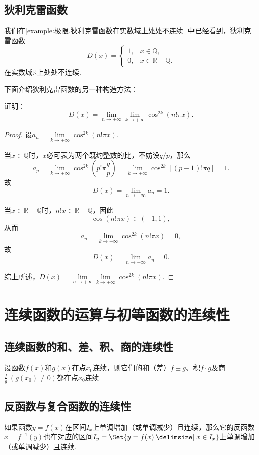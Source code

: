 \subsection{狄利克雷函数}
我们在\cref{example:极限.狄利克雷函数在实数域上处处不连续} 中已经看到，狄利克雷函数\[
D(x) = \left\{ \begin{array}{ll}
1, & x \in \mathbb{Q}, \\
0, & x \in \mathbb{R} - \mathbb{Q}.
\end{array} \right.
\]在实数域\(\mathbb{R}\)上处处不连续.

下面介绍狄利克雷函数的另一种构造方法：
\begin{example}
证明：\[
D(x) = \lim\limits_{n\to+\infty} \lim\limits_{k\to+\infty} \cos^{2k}(n! \pi x).
\]
\begin{proof}
设\(a_n = \lim\limits_{k\to+\infty} \cos^{2k}(n! \pi x)\).

当\(x \in \mathbb{Q}\)时，\(x\)必可表为两个既约整数的比，不妨设\(q/p\)，那么\[
a_p = \lim\limits_{k\to+\infty} \cos^{2k}\left(p! \pi \frac{q}{p}\right)
= \lim\limits_{k\to+\infty} \cos^{2k}[(p-1)! \pi q] = 1.
\]故\[
D(x) = \lim\limits_{n\to+\infty} a_n = 1.
\]

当\(x \in \mathbb{R}-\mathbb{Q}\)时，\(n! x \in \mathbb{R}-\mathbb{Q}\)，因此\[
\cos(n! \pi x) \in (-1,1),
\]从而\[
a_n = \lim\limits_{k\to+\infty} \cos^{2k}(n! \pi x) = 0,
\]故\[
D(x) = \lim\limits_{n\to+\infty} a_n = 0.
\]

综上所述，\(D(x) = \lim\limits_{n\to+\infty} \lim\limits_{k\to+\infty} \cos^{2k}(n! \pi x)\).
\end{proof}
\end{example}

\section{连续函数的运算与初等函数的连续性}
\subsection{连续函数的和、差、积、商的连续性}
\begin{theorem}\label{theorem:极限.连续函数的极限1}
设函数\(f(x)\)和\(g(x)\)在点\(x_0\)连续，则它们的和（差）\(f \pm g\)、积\(f \cdot g\)及商\(\frac{f}{g}\ (g(x_0)\neq0)\)都在点\(x_0\)连续.
\end{theorem}

\subsection{反函数与复合函数的连续性}
\begin{theorem}\label{theorem:极限.连续函数的极限2}
如果函数\(y = f(x)\)在区间\(I_x\)上单调增加（或单调减少）且连续，那么它的反函数\(x = f^{-1}(y)\)也在对应的区间\(I_y = \Set{ y = f(x) \given x \in I_x }\)上单调增加（或单调减少）且连续.
\end{theorem}

